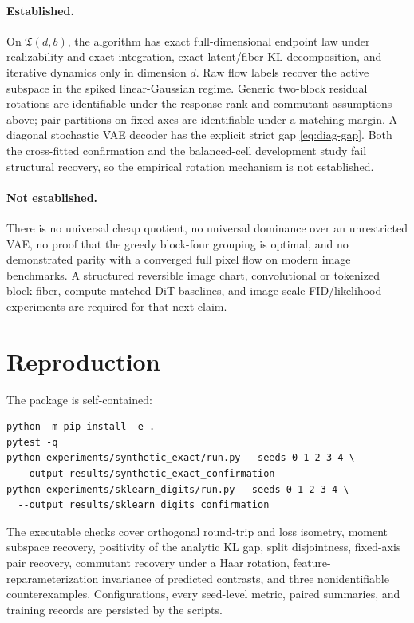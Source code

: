 \paragraph{Established.}
On $\mathfrak T(d,b)$, the algorithm has exact full-dimensional endpoint law under realizability and exact integration, exact latent/fiber KL decomposition, and iterative dynamics only in dimension $d$.  Raw flow labels recover the active subspace in the spiked linear-Gaussian regime.  Generic two-block residual rotations are identifiable under the response-rank and commutant assumptions above; pair partitions on fixed axes are identifiable under a matching margin.  A diagonal stochastic VAE decoder has the explicit strict gap \eqref{eq:diag-gap}.  Both the cross-fitted confirmation and the balanced-cell development study fail structural recovery, so the empirical rotation mechanism is not established.

\paragraph{Not established.}
There is no universal cheap quotient, no universal dominance over an unrestricted VAE, no proof that the greedy block-four grouping is optimal, and no demonstrated parity with a converged full pixel flow on modern image benchmarks.  A structured reversible image chart, convolutional or tokenized block fiber, compute-matched DiT baselines, and image-scale FID/likelihood experiments are required for that next claim.

\section{Reproduction}

The package is self-contained:
\begin{verbatim}
python -m pip install -e .
pytest -q
python experiments/synthetic_exact/run.py --seeds 0 1 2 3 4 \
  --output results/synthetic_exact_confirmation
python experiments/sklearn_digits/run.py --seeds 0 1 2 3 4 \
  --output results/sklearn_digits_confirmation
\end{verbatim}
The executable checks cover orthogonal round-trip and loss isometry, moment subspace recovery, positivity of the analytic KL gap, split disjointness, fixed-axis pair recovery, commutant recovery under a Haar rotation, feature-reparameterization invariance of predicted contrasts, and three nonidentifiable counterexamples.  Configurations, every seed-level metric, paired summaries, and training records are persisted by the scripts.

